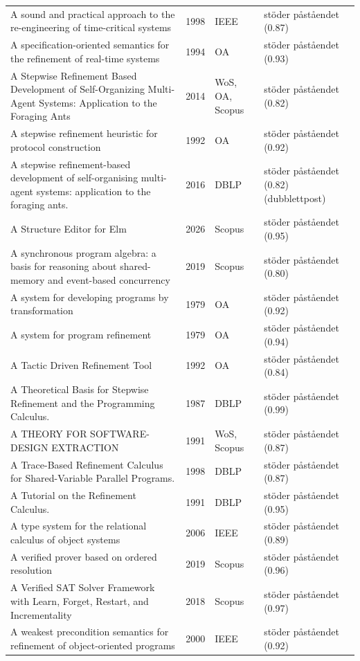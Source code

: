 \begin{longtable}{@{}%
  >{\raggedright\arraybackslash}p{}c%
  >{\raggedright\arraybackslash}p{}%
  >{\raggedright\arraybackslash}p{}@{}}
A sound and practical approach to the re-engineering of time-critical systems & 1998 & IEEE & stöder påståendet (0.87) \\
A specification-oriented semantics for the refinement of real-time systems & 1994 & OA & stöder påståendet (0.93) \\
A Stepwise Refinement Based Development of Self-Organizing Multi-Agent Systems: Application to the Foraging Ants & 2014 & WoS, OA, Scopus & stöder påståendet (0.82) \\
A stepwise refinement heuristic for protocol construction & 1992 & OA & stöder påståendet (0.92) \\
A stepwise refinement-based development of self-organising multi-agent systems: application to the foraging ants. & 2016 & DBLP & stöder påståendet (0.82) (dubblettpost) \\
A Structure Editor for Elm & 2026 & Scopus & stöder påståendet (0.95) \\
A synchronous program algebra: a basis for reasoning about shared-memory and event-based concurrency & 2019 & Scopus & stöder påståendet (0.80) \\
A system for developing programs by transformation & 1979 & OA & stöder påståendet (0.92) \\
A system for program refinement & 1979 & OA & stöder påståendet (0.94) \\
A Tactic Driven Refinement Tool & 1992 & OA & stöder påståendet (0.84) \\
A Theoretical Basis for Stepwise Refinement and the Programming Calculus. & 1987 & DBLP & stöder påståendet (0.99) \\
A THEORY FOR SOFTWARE-DESIGN EXTRACTION & 1991 & WoS, Scopus & stöder påståendet (0.87) \\
A Trace-Based Refinement Calculus for Shared-Variable Parallel Programs. & 1998 & DBLP & stöder påståendet (0.87) \\
A Tutorial on the Refinement Calculus. & 1991 & DBLP & stöder påståendet (0.95) \\
A type system for the relational calculus of object systems & 2006 & IEEE & stöder påståendet (0.89) \\
A verified prover based on ordered resolution & 2019 & Scopus & stöder påståendet (0.96) \\
A Verified SAT Solver Framework with Learn, Forget, Restart, and Incrementality & 2018 & Scopus & stöder påståendet (0.97) \\
A weakest precondition semantics for refinement of object-oriented programs & 2000 & IEEE & stöder påståendet (0.92) \\

\end{longtable}
